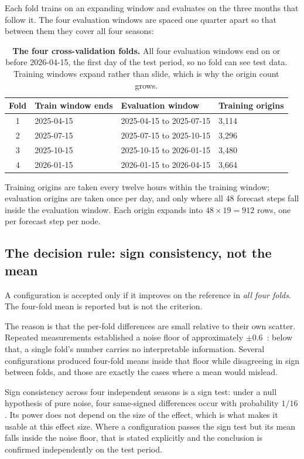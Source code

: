 Each fold trains on an expanding window and evaluates on the three months that follow it.
The four evaluation windows are spaced one quarter apart so that between them they cover
all four seasons:

\begin{table}[htp]
\centering
\begin{tabular}{clll}
\toprule
{\bf Fold} & {\bf Train window ends} & {\bf Evaluation window} & {\bf Training origins} \\
\midrule
1 & 2025-04-15 & 2025-04-15 to 2025-07-15 & 3,114 \\
2 & 2025-07-15 & 2025-07-15 to 2025-10-15 & 3,296 \\
3 & 2025-10-15 & 2025-10-15 to 2026-01-15 & 3,480 \\
4 & 2026-01-15 & 2026-01-15 to 2026-04-15 & 3,664 \\
\bottomrule
\end{tabular}
\caption[Cross-validation folds]{\textbf{The four cross-validation folds.} All four
evaluation windows end on or before 2026-04-15, the first day of the test period, so no
fold can see test data. Training windows expand rather than slide, which is why the origin
count grows.}
\label{tab:folds}
\end{table}

Training origins are taken every twelve hours within the training window; evaluation
origins are taken once per day, and only where all 48 forecast steps fall inside the
evaluation window. Each origin expands into $48 \times 19 = 912$ rows, one per forecast
step per node.

\subsection{The decision rule: sign consistency, not the mean}
\label{sec:signrule}

A configuration is accepted only if it improves on the reference in \emph{all four folds}.
The four-fold mean is reported but is not the criterion.

The reason is that the per-fold differences are small relative to their own scatter.
Repeated measurements established a noise floor of approximately
$\pm 0.6$~\pp: below that, a single fold's number carries no interpretable information.
Several configurations produced four-fold means inside that floor while disagreeing in
sign between folds, and those are exactly the cases where a mean would mislead.

Sign consistency across four independent seasons is a sign test: under a null hypothesis
of pure noise, four same-signed differences occur with probability $1/16$. Its power does
not depend on the size of the effect, which is what makes it usable at this effect size.
Where a configuration passes the sign test but its mean falls inside the noise floor, that
is stated explicitly and the conclusion is confirmed independently on the test period.

